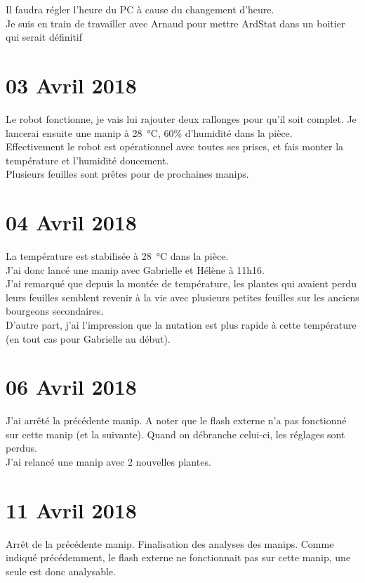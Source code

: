 \documentclass[10pt,a4paper]{article}
\begin{document}
Il faudra régler l'heure du PC à cause du changement d'heure.\\

Je suis en train de travailler avec Arnaud pour mettre ArdStat dans un boitier qui serait définitif

\section{03 Avril 2018}
Le robot fonctionne, je vais lui rajouter deux rallonges pour qu'il soit complet. Je lancerai ensuite une manip à \SI{28}{\celsius}, 60\% d'humidité dans la pièce.\\ Effectivement le robot est opérationnel avec toutes ses prises, et fais monter la température et l'humidité doucement.\\

Plusieurs feuilles sont prêtes pour de prochaines manips.

\section{04 Avril 2018}
La température est stabilisée à \SI{28}{\celsius} dans la pièce.\\
J'ai donc lancé une manip avec Gabrielle et Hélène à 11h16.\\

J'ai remarqué que depuis la montée de température, les plantes qui avaient perdu leurs feuilles semblent revenir à la vie avec plusieurs petites feuilles sur les anciens bourgeons secondaires.\\
D'autre part, j'ai l'impression que la nutation est plus rapide à cette température (en tout cas pour Gabrielle au début).

\section{06 Avril 2018}
J'ai arrêté la précédente manip. A noter que le flash externe n'a pas fonctionné sur cette manip (et la suivante). Quand on débranche celui-ci, les réglages sont perdus.\\

J'ai relancé une manip avec 2 nouvelles plantes.

\section{11 Avril 2018}
Arrêt de la précédente manip. Finalisation des analyses des manips. Comme indiqué précédemment, le flash externe ne fonctionnait pas sur cette manip, une seule est donc analysable.
\end{document}
